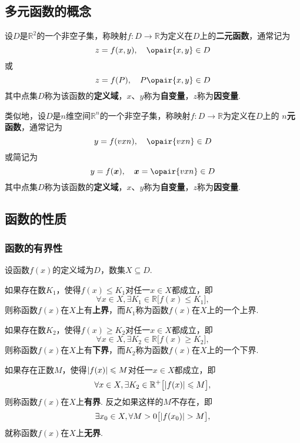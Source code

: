 \subsection{多元函数的概念}
\begin{definition}
设\(D\)是\(\mathbb{R}^2\)的一个非空子集，称映射\(f\colon D \to \mathbb{R}\)为定义在\(D\)上的\textbf{二元函数}，通常记为\[
z = f(x,y),
\quad \opair{x,y} \in D
\]或\[
z = f(P),
\quad P\opair{x,y} \in D
\]其中点集\(D\)称为该函数的\textbf{定义域}，\(x\)、\(y\)称为\textbf{自变量}，\(z\)称为\textbf{因变量}.
\end{definition}

\begin{definition}
类似地，设\(D\)是\(n\)维空间\(\mathbb{R}^n\)的一个非空子集，称映射\(f\colon D \to \mathbb{R}\)为定义在\(D\)上的\textbf{ \(n\)元函数}，通常记为\[
y = f(\v{x}{n}),
\quad \opair{\v{x}{n}} \in D
\]或简记为\[
y = f(\mat{x}),
\quad \mat{x}=\opair{\v{x}{n}} \in D
\]其中点集\(D\)称为该函数的\textbf{定义域}，\(x\)、\(y\)称为\textbf{自变量}，\(z\)称为\textbf{因变量}.
\end{definition}

\subsection{函数的性质}
\subsubsection{函数的有界性}
\begin{definition}
设函数\(f(x)\)的定义域为\(D\)，数集\(X \subseteq D\).

如果存在数\(K_1\)，使得\(f(x) \leqslant K_1\)对任一\(x \in X\)都成立，即\[
\forall x \in X, \exists K_1 \in \mathbb{R} \bigl[
	f(x) \leqslant K_1
\bigr],
\]则称函数\(f(x)\)在\(X\)上有\textbf{上界}，而\(K_1\)称为函数\(f(x)\)在\(X\)上的一个上界.

如果存在数\(K_2\)，使得\(f(x) \geqslant K_2\)对任一\(x \in X\)都成立，即\[
\forall x \in X, \exists K_2 \in \mathbb{R} \bigl[
	f(x) \geqslant K_2
\bigr],
\]则称函数\(f(x)\)在\(X\)上有\textbf{下界}，而\(K_2\)称为函数\(f(x)\)在\(X\)上的一个下界.

如果存在正数\(M\)，使得\(\abs{f(x)} \leqslant M\)对任一\(x \in X\)都成立，即\[
\forall x \in X, \exists K_2 \in \mathbb{R}^+ \bigl[
	\abs{f(x)} \leqslant M
\bigr],
\]则称函数\(f(x)\)在\(X\)上\textbf{有界}.
反之如果这样的\(M\)不存在，即\[
\exists x_0 \in X, \forall M > 0 \bigl[
	\abs{f(x_0)} > M
\bigr],
\]就称函数\(f(x)\)在\(X\)上\textbf{无界}.
\end{definition}

